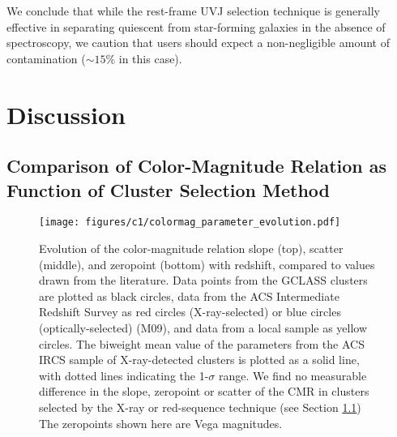 We conclude that while the rest-frame UVJ selection technique is generally effective in separating quiescent from star-forming galaxies in the absence of spectroscopy, we caution that users should expect a non-negligible amount of contamination ($\sim 15\%$ in this case).


\section{Discussion} \label{comparison}

\subsection{Comparison of Color-Magnitude Relation as Function of Cluster Selection Method}\label{sec-evo}

\begin{figure}
\texttt{[image: figures/c1/colormag\_parameter\_evolution.pdf]}
\caption[Evolution of color-magnitude relation slope, scatter, and intercept with redshift]{Evolution of the color-magnitude relation slope (top), scatter (middle), and zeropoint (bottom) with redshift, compared to values drawn from the literature. Data points from the GCLASS clusters are plotted as black circles, data from the ACS Intermediate Redshift Survey as red circles (X-ray-selected) or blue circles (optically-selected) (M09), and data from a local sample \citep{Bower:1992mb,van-Dokkum:1998wd,Ellis:1997lk} as yellow circles. The biweight mean value of the parameters from the ACS IRCS sample of X-ray-detected clusters is plotted as a solid line, with dotted lines indicating the 1-$\sigma$ range. We find no measurable difference in the slope, zeropoint or scatter of the CMR in clusters selected by the X-ray or red-sequence technique (see Section \ref{sec-evo}) The zeropoints shown here are Vega magnitudes.
\label{fig-params}}
\end{figure}

